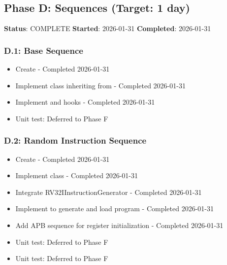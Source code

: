 \subsection{Phase D: Sequences (Target: 1 day)}\label{cr:status:pyuvm-migration:phase-d-sequences-target-1-day}

\begin{record}

\textbf{Status}: \ok{} COMPLETE \textbf{Started}: 2026-01-31
\textbf{Completed}: 2026-01-31

\end{record}

\subsubsection{D.1: Base Sequence}\label{cr:status:pyuvm-migration:d1-base-sequence}

\begin{record}

\begin{itemize}
\tightlist
\item[$\boxtimes$]
  Create  - Completed
  2026-01-31
\item[$\boxtimes$]
  Implement  class inheriting from
   - Completed 2026-01-31
\item[$\boxtimes$]
  Implement  and  hooks - Completed
  2026-01-31
\item[$\boxtimes$]
  Unit test: Deferred to Phase F
\end{itemize}

\end{record}

\subsubsection{D.2: Random Instruction Sequence}\label{cr:status:pyuvm-migration:d2-random-instruction-sequence}

\begin{record}

\begin{itemize}
\tightlist
\item[$\boxtimes$]
  Create  - Completed
  2026-01-31
\item[$\boxtimes$]
  Implement  class - Completed
  2026-01-31
\item[$\boxtimes$]
  Integrate RV32IInstructionGenerator - Completed 2026-01-31
\item[$\boxtimes$]
  Implement  to generate and load program - Completed
  2026-01-31
\item[$\boxtimes$]
  Add APB sequence for register initialization - Completed 2026-01-31
\item[$\boxtimes$]
  Unit test: Deferred to Phase F
\item[$\boxtimes$]
  Unit test: Deferred to Phase F
\end{itemize}

\end{record}

